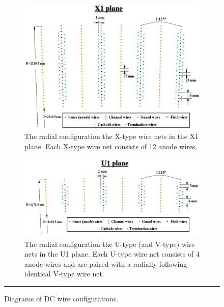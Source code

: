 \begin{figure}[H]
    \ContinuedFloat %
\begin{subfigure}[p]{1\textwidth}
  \centering
    \includegraphics[width=1\textwidth]{Figures/DCX1net.jpg}

  \caption{The radial configuration the X-type wire nets in the X1 plane. Each X-type wire net consists of 12 anode wires.}
  \label{fig:X1dcdiagram}
\end{subfigure}

\begin{subfigure}[p]{1\textwidth}
  \centering
    \includegraphics[width=1\textwidth]{Figures/DCU1net.jpg}
    
  \caption{The radial configuration the U-type (and V-type) wire nets in the U1 plane. Each U-type wire net consists of 4 anode wires and are paired with a radially following identical V-type wire net.}
  \label{fig:U1dcdiagram}
\end{subfigure}
\rule{35em}{0.5pt}
\caption[Diagrams of DC wire configurations.]{Diagrams of DC wire configurations.}
\label{fig:dcdiagram}
\end{figure}
